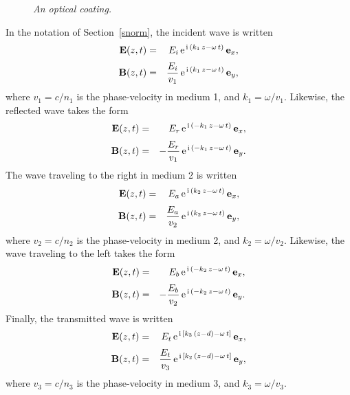 \begin{figure}
\epsfysize=2.25in
\centerline{}
\caption{\em An optical coating.}\label{fcoat}
\end{figure}

In the notation of Section~\ref{snorm}, the incident wave is written
\begin{eqnarray}
{\bf E}(z,t) &=& E_i\,{\rm e}^{\,{\rm i}\,(k_1\,z-\omega\,t)}
\,{\bf e}_x,\\[0.5ex]
{\bf B}(z,t)&=&\frac{E_i}{v_1}\,{\rm e}^{\,{\rm i}\,(k_1\,z-\omega\,t)}\,{\bf e}_y,
\end{eqnarray}
where $v_1=c/n_1$ is the phase-velocity in medium 1, and $k_1=\omega/v_1$. Likewise, the reflected wave takes the form
\begin{eqnarray}
{\bf E}(z,t) &=& E_r\,{\rm e}^{\,{\rm i}\,(-k_1\,z-\omega\,t)}\,{\bf e}_x,\\[0.5ex]
{\bf B}(z,t) &=&-\frac{E_r}{v_1}\,{\rm e}^{\,{\rm i}\,(-k_1\,z-\omega\,t)}\,{\bf e}_y.
\end{eqnarray}
The wave traveling to the right in medium 2 is written
\begin{eqnarray}
{\bf E}(z,t) &=& E_a\,{\rm e}^{\,{\rm i}\,(k_2\,z-\omega\,t)}
\,{\bf e}_x,\\[0.5ex]
{\bf B}(z,t)&=&\frac{E_a}{v_2}\,{\rm e}^{\,{\rm i}\,(k_2\,z-\omega\,t)}\,{\bf e}_y,
\end{eqnarray}
where $v_2=c/n_2$ is the phase-velocity in medium 2, and $k_2=\omega/v_2$. 
Likewise, the wave traveling to the left takes the form
\begin{eqnarray}
{\bf E}(z,t) &=& E_b\,{\rm e}^{\,{\rm i}\,(-k_2\,z-\omega\,t)}\,{\bf e}_x,\\[0.5ex]
{\bf B}(z,t) &=&-\frac{E_b}{v_2}\,{\rm e}^{\,{\rm i}\,(-k_2\,z-\omega\,t)}\,{\bf e}_y.
\end{eqnarray}
Finally, the transmitted wave is  written
\begin{eqnarray}
{\bf E}(z,t) &=& E_t\,{\rm e}^{\,{\rm i}\,[k_3\,(z-d)-\omega\,t]}\,{\bf e}_x,\\[0.5ex]
{\bf B}(z,t) &=&\frac{E_t}{v_3}\,{\rm e}^{\,{\rm i}\,[k_2\,(z-d)-\omega\,t]}\,{\bf e}_y,
\end{eqnarray}
where $v_3=c/n_3$ is the phase-velocity in medium 3, and $k_3=\omega/v_3$.

